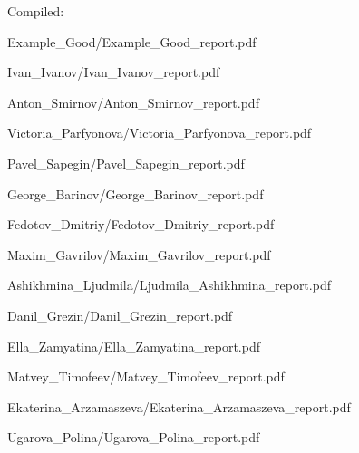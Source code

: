 \documentclass[a4paper]{article}
\begin{document}
Compiled: \DTMnow
\tableofcontents

\clearpage

{Example_Good/Example_Good_report.pdf}

{Ivan_Ivanov/Ivan_Ivanov_report.pdf}

{Anton_Smirnov/Anton_Smirnov_report.pdf}

{Victoria_Parfyonova/Victoria_Parfyonova_report.pdf}

{Pavel_Sapegin/Pavel_Sapegin_report.pdf}

{George_Barinov/George_Barinov_report.pdf}

{Fedotov_Dmitriy/Fedotov_Dmitriy_report.pdf}

{Maxim_Gavrilov/Maxim_Gavrilov_report.pdf}

{Ashikhmina_Ljudmila/Ljudmila_Ashikhmina_report.pdf}

{Danil_Grezin/Danil_Grezin_report.pdf}

{Ella_Zamyatina/Ella_Zamyatina_report.pdf}

{Matvey_Timofeev/Matvey_Timofeev_report.pdf}

{Ekaterina_Arzamaszeva/Ekaterina_Arzamaszeva_report.pdf}

{Ugarova_Polina/Ugarova_Polina_report.pdf}

\end{document}
